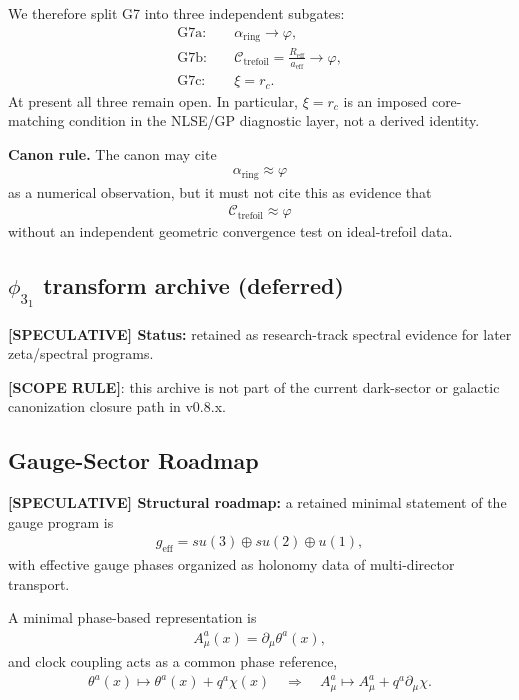 We therefore split G7 into three independent subgates:
\begin{align}
    \mathrm{G7a}:&\quad \alpha_{\mathrm{ring}}\to\varphi,\\
    \mathrm{G7b}:&\quad
    \mathcal{C}_{\mathrm{trefoil}}
    =
    \frac{R_{\mathrm{eff}}}{a_{\mathrm{eff}}}
    \to\varphi,\\
    \mathrm{G7c}:&\quad \xi=r_c.
\end{align}
At present all three remain open. In particular, \(\xi=r_c\) is an imposed
core-matching condition in the NLSE/GP diagnostic layer, not a derived
identity.

\textbf{Canon rule.}
The canon may cite
\begin{align}
    \alpha_{\mathrm{ring}}\approx\varphi
\end{align}
as a numerical observation, but it must not cite this as evidence that
\begin{align}
    \mathcal{C}_{\mathrm{trefoil}}\approx\varphi
\end{align}
without an independent geometric convergence test on ideal-trefoil data.

\subsection{\texorpdfstring{$\phi_{3_1}$}{phi3_1} transform archive (deferred)}
\textbf{[SPECULATIVE] Status:} retained as research-track spectral evidence for later zeta/spectral programs.

\textbf{[SCOPE RULE]}: this archive is not part of the current dark-sector or galactic canonization closure path in v0.8.x.

\subsection{Gauge-Sector Roadmap}
\textbf{[SPECULATIVE] Structural roadmap:} a retained minimal statement of the gauge program is
\begin{align}
    g_{\mathrm{eff}} = su(3) \oplus su(2) \oplus u(1),
\end{align}
with effective gauge phases organized as holonomy data of multi-director transport.

A minimal phase-based representation is
\begin{align}
    A^a_{\mu}(x) = \partial_{\mu}\theta^a(x),
\end{align}
and clock coupling acts as a common phase reference,
\begin{align}
    \theta^a(x) \mapsto \theta^a(x)+q^a\chi(x)
    \quad\Rightarrow\quad
    A^a_{\mu}\mapsto A^a_{\mu}+q^a\partial_{\mu}\chi.
\end{align}

